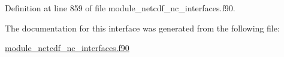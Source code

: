 Definition at line 859 of file module\+\_\+netcdf\+\_\+nc\+\_\+interfaces.\+f90.



The documentation for this interface was generated from the following file\+:\begin{DoxyCompactItemize}
\item 
\hyperlink{module__netcdf__nc__interfaces_8f90}{module\+\_\+netcdf\+\_\+nc\+\_\+interfaces.\+f90}\end{DoxyCompactItemize}
